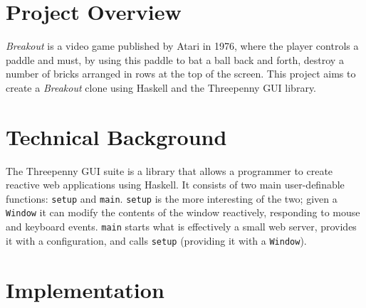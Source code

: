 \documentclass[12pt]{article}
\begin{document}
\maketitle
\tableofcontents

\section{Project Overview}

\textit{Breakout} is a video game published by Atari in 1976, where the player controls a paddle and must, by using this paddle to bat a ball back and forth, destroy a number of bricks arranged in rows at the top of the screen.
This project aims to create a \textit{Breakout} clone using Haskell and the Threepenny GUI library.

\section{Technical Background}

The Threepenny GUI suite is a library that allows a programmer to create reactive web applications using Haskell.
It consists of two main user-definable functions: \verb|setup| and \verb|main|.
\verb|setup| is the more interesting of the two; given a \verb|Window| it can modify the contents of the window reactively, responding to mouse and keyboard events.
\verb|main| starts what is effectively a small web server, provides it with a configuration, and calls \verb|setup| (providing it with a \verb|Window|).

\section{Implementation}
\end{document}
